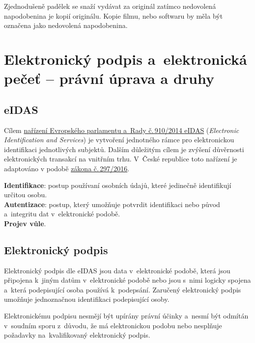 Zjednodušeně padělek se snaží vydávat za originál zatímco nedovolená napodobenina je kopií originálu. Kopie filmu, nebo softwaru by měla být označena jako nedovolená napodobenina.






\clearpage
\section[Elektronický podpis a~elektronická pečeť -- právní úprava a~druhy]{Elektronický podpis a~elektronická pečeť -- \newline právní úprava a druhy}

\subsection{eIDAS}

Cílem \href{https://eur-lex.europa.eu/legal-content/CS/TXT/?uri=CELEX\%3A32014R0910}{nařízení Evropského parlamentu a~Rady č.\,910/2014 eIDAS} (\emph{Electronic Identification and Services}) je vytvoření jednotného rámce pro elektronickou identifikaci jednotlivých subjektů. Dalším důležitým cílem je zvýšení důvěrnosti elektronických transakcí na vnitřním trhu. V~České republice toto nařízení je adaptováno v podobě \href{https://www.zakonyprolidi.cz/cs/2016-297}{zákona č.\,297/2016}.

\textbf{Identifikace}: postup používaní osobních údajů, které jedinečně identifikují určitou osobu. \\
\textbf{Autentizace}: postup, který umožňuje potvrdit identifikaci nebo původ a~integritu dat v~elektronické podobě. \\
\textbf{Projev vůle}.

\subsection{Elektronický podpis}

Elektronický podpis dle eIDAS jsou data v~elektronické podobě, která jsou připojena k~jiným datům v~elektronické podobě nebo jsou s~nimi logicky spojena a~která podepisující osoba používá k~podepsání. Zaručený elektronický podpis umožňuje jednoznačnou identifikaci podepisující osoby.

Elektronickému podpisu nesmějí být upírány právní účinky a~nesmí být odmítán v~soudním sporu z~důvodu, že má elektronickou podobu nebo nesplňuje požadavky na~kvalifikovaný elektronický podpis.

